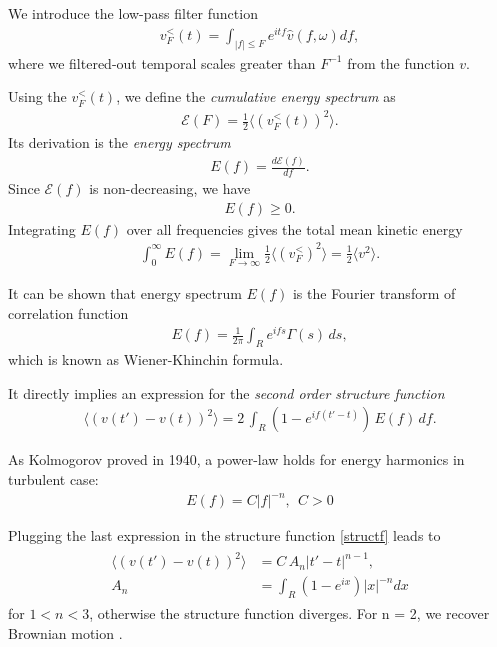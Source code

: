 We introduce the low-pass filter function
\begin{align}
v_F^{<}(t) = \int_{|f| \leq F} e^{itf} \hat{v}(f,\omega) df,
\end{align} 
where we filtered-out temporal scales greater than $F^{-1}$ from the function $v$.

Using the $v_F^{<}(t)$, we define the \textit{cumulative energy spectrum} as
\begin{align*}
\mathcal{E}(F) = \frac{1}{2} \langle (v_F^{<}(t))^2 \rangle.
\end{align*}
Its derivation is the \textit{energy spectrum}
\begin{align*}
E(f) = \frac{d\mathcal{E}(f)}{df}.
\end{align*}
Since $\mathcal{E}(f)$ is non-decreasing, we have
\begin{align*}
E(f) \geq 0.
\end{align*}
Integrating  $E(f)$ over all frequencies gives the total mean kinetic energy
\begin{align}
\int_0^{\infty} E(f) = \lim_{F \to \infty} \frac{1}{2} \langle (v_F^{<})^2 \rangle = \frac{1}{2} \langle v^2 \rangle.
\end{align}

It can be shown that energy spectrum $E(f)$ is the Fourier transform of correlation function
\begin{align*} 
E(f)  = \frac{1}{2 \pi} \int_{R} e^{ifs} \Gamma(s) \,ds,
\end{align*}
which is known as Wiener-Khinchin formula.

It directly implies an expression for the \textit{second order structure function}
\begin{align}\label{structf}
\langle (v(t') - v(t))^2 \rangle = 2 \, \int_{R} (1 - e^{if(t' - t)}) \, E(f) \, df.
\end{align}

As Kolmogorov proved in 1940, a power-law holds for energy harmonics in turbulent case:
\begin{align}
E(f) = C |f|^{-n}, ~~ C>0
\end{align}

Plugging the last expression in the structure function \ref{structf} leads to
\begin{align} \label{Brown}
\begin{split}
\langle (v(t') - v(t))^2 \rangle &= C\,A_n |t' - t|^{n-1}, \\
A_n &= \int_R (1-e^{ix}) |x|^{-n} dx
\end{split}
\end{align}
for $1 < n < 3$, otherwise the structure function diverges. For n = 2, we recover Brownian motion \cite{tur}.